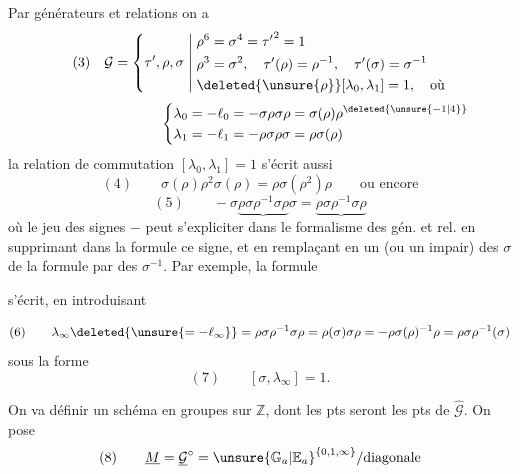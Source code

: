 Par générateurs et relations on a
\[
(3)\quad\mathcal{G}=\left\{\tau',\rho,\sigma\;\middle|\;
\begin{aligned}
&\rho^6=\sigma^4={\tau'}^2=1\\
&\rho^3=\sigma^2,\quad\tau'(\rho)=\rho^{-1},\quad\tau'(\sigma)=\sigma^{-1}\\
&\deleted{\unsure{\rho}}[\lambda_0,\lambda_1]=1,\quad\text{où}
\end{aligned}\right.
\]
\[
\hspace{8em}\left\{
\begin{aligned}
\lambda_0&=-\ell_0=-\sigma\rho\sigma\rho=\sigma(\rho)\rho^{\deleted{\unsure{-1|4}}}\\
\lambda_1&=-\ell_1=-\rho\sigma\rho\sigma=\rho\sigma(\rho)
\end{aligned}\right.
\]
 la relation de commutation $[\lambda_0,\lambda_1]=1$ s'écrit aussi
\[
(4)\qquad \sigma(\rho)\rho^2\sigma(\rho)=\rho\sigma(\rho^2)\rho
\qquad\text{ou encore}
\]
\[
(5)\qquad -\sigma\underbrace{\rho\sigma\rho^{-1}\sigma\rho}\sigma
=\underbrace{\rho\sigma\rho^{-1}\sigma\rho}
\]
où le jeu des signes $-$ peut s'expliciter dans le formalisme des gén. et rel. en supprimant dans la formule ce signe, et en remplaçant en  un (ou un  impair) des $\sigma$ de la formule par des $\sigma^{-1}$. Par exemple, la formule


s'écrit, en introduisant


\[
(6)\qquad
\lambda_\infty\deleted{\unsure{=-\ell_\infty}}
=\rho\sigma\rho^{-1}\sigma\rho
=\rho(\sigma)\sigma\rho
=-\rho\sigma(\rho)^{-1}\rho
=\rho\sigma\rho^{-1}(\sigma)
\]
sous la forme
\[
(7)\qquad [\sigma,\lambda_\infty]=1.
\]


On va définir un schéma en groupes  sur $\mathbb{Z}$, dont les pts seront  les pts de $\widehat{\mathcal{G}}$. On pose
\[
(8)\qquad
\underline{M}=\underline{\mathcal{G}}^{\circ}
=\unsure{\mathbb{G}_a|\mathbb{E}_a}^{\{0,1,\infty\}}/\text{diagonale}
\]

